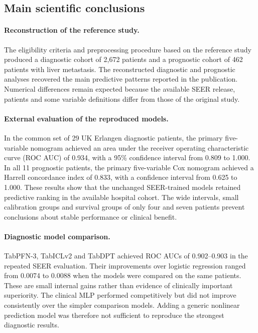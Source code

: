 \subsection{Main scientific conclusions}

\paragraph{Reconstruction of the reference study.}
The eligibility criteria and preprocessing procedure based on the reference
study produced a diagnostic cohort of 2,672 patients and a prognostic cohort of
462 patients with liver metastasis. The reconstructed diagnostic and prognostic
analyses recovered the main predictive patterns reported in the publication.
Numerical differences remain expected because the available SEER release,
patients and some variable definitions differ from those of the original study.

\paragraph{External evaluation of the reproduced models.}
In the common set of 29 UK Erlangen diagnostic patients, the primary
five-variable nomogram achieved an area under the receiver operating
characteristic curve (ROC AUC) of 0.934, with a 95\% confidence interval from
0.809 to 1.000. In all 11 prognostic patients, the primary five-variable Cox
nomogram achieved a Harrell concordance index of 0.833, with a confidence
interval from 0.625 to 1.000. These results show that the unchanged SEER-trained
models retained predictive ranking in the available hospital cohort. The wide
intervals, small calibration groups and survival groups of only four and seven
patients prevent conclusions about stable performance or clinical benefit.

\paragraph{Diagnostic model comparison.}
TabPFN-3, TabICLv2 and TabDPT achieved ROC AUCs of 0.902--0.903 in the repeated
SEER evaluation. Their improvements over logistic regression ranged from
0.0074 to 0.0088 when the models were compared on the same patients. These are
small internal gains rather than evidence of clinically important superiority.
The clinical MLP performed competitively but did not improve consistently over
the simpler comparison models. Adding a generic nonlinear prediction model was
therefore not sufficient to reproduce the strongest diagnostic results.


